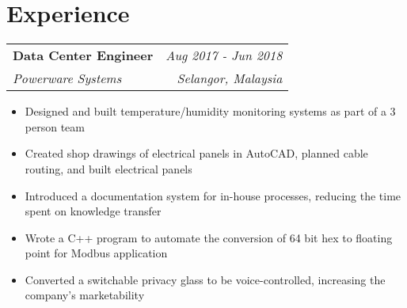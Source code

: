 \documentclass[letterpaper,11pt]{article}
\makeatletter
\newcommand{\resumeItem}[2]{
  \item\small{
    \textbf{#1}{: #2 \vspace{-3pt}}
  }
}
\newcommand{\JobSubheading}[4]{
  \vspace{-1pt}
    \begin{tabular*}{\textwidth}[t]{l@{\extracolsep{\fill}}r}
      \textbf {#1} & \textit{#2}  \\
      \textit{#3} & \textit{#4} \\
    \end{tabular*}\vspace{-5pt}
}
\newcommand{\resumeSubItem}[2]{\resumeItem{#1}{#2}\vspace{-3.5pt}}
\makeatother
\begin{document}
\begin{comment}
    \resumeSubItem{Handwritten Digit Recognition}
      {Using HOG (Histogram of Oriented Gradients), SVM (Support Vector Machine), and OpenCV. On [placeholder] dataset, achieved [placeholder] accuracy}
      
    \end{comment}

        


    

\section{\color{BlueViolet} Experience}
    \vspace{-2pt}
    \JobSubheading
      {Data Center Engineer}{Aug 2017 - Jun 2018}
      {Powerware Systems}{Selangor, Malaysia}
      \vspace{-1pt}
        \begin{itemize}
            \item Designed and built temperature/humidity monitoring systems as part of a 3 person team
            \vspace{-3pt}
            \item Created shop drawings of electrical panels in AutoCAD, planned cable routing, and built electrical panels
            \vspace{-3pt}
            \item Introduced a documentation system for in-house processes, reducing the time spent on knowledge transfer 
	\vspace{-3pt}
	\item Wrote a C++ program to automate the conversion of 64 bit hex to floating point for Modbus application
          \vspace{-3pt}
	\item Converted a switchable privacy glass to be voice-controlled, increasing the company's marketability

        \end{itemize}
    \vspace{0pt}
\end{document}
